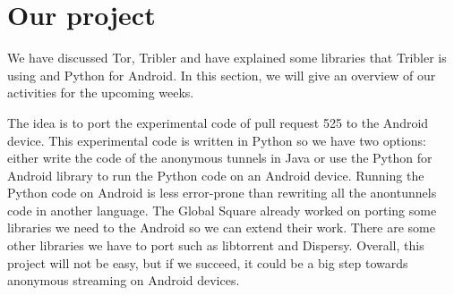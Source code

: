 \section{Our project}
	\label{sec:our-project}
	We have discussed Tor, Tribler and have explained some libraries that Tribler is using and Python for Android. In this section, we will give an overview of our activities for the upcoming weeks.
		
	The idea is to port the experimental code of pull request 525 to the Android device. This experimental code is written in Python so we have two options: either write the code of the anonymous tunnels in Java or use the Python for Android library to run the Python code on an Android device. Running the Python code on Android is less error-prone than rewriting all the anontunnels code in another language. The Global Square already worked on porting some libraries we need to the Android so we can extend their work. There are some other libraries we have to port such as libtorrent and Dispersy. Overall, this project will not be easy, but if we succeed, it could be a big step towards anonymous streaming on Android devices.
